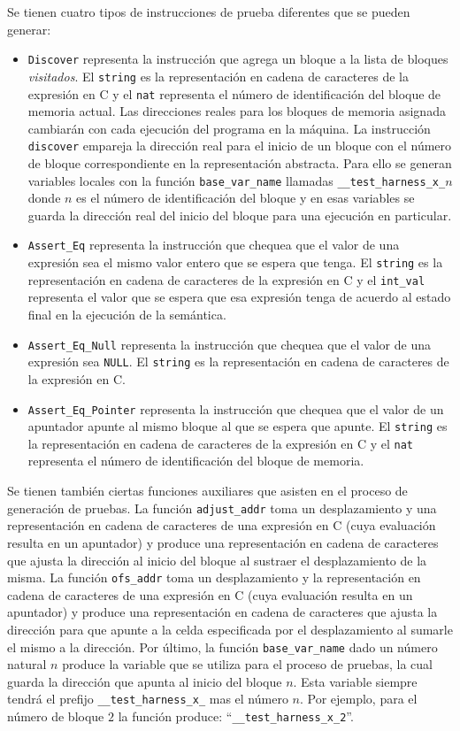 Se tienen cuatro tipos de instrucciones de prueba diferentes que se pueden generar:

\begin{itemize}
  \item{\verb|Discover| representa la instrucción que agrega un bloque a la lista de bloques \textit{visitados}.
  El \verb|string| es la representación en cadena de caracteres de la expresión en C y el \verb|nat| representa el número de identificación del bloque de memoria actual.
  Las direcciones reales para los bloques de memoria asignada cambiarán con cada ejecución del programa en la máquina.
  La instrucción \verb|discover| empareja la dirección real para el inicio de un bloque con el número de bloque correspondiente en la representación abstracta.
  Para ello se generan variables locales con la función \verb|base_var_name| llamadas \verb|__test_harness_x_|$n$ donde $n$ es el número de identificación del bloque y en esas variables se guarda la dirección real del inicio del bloque para una ejecución en particular.}
  \item{\verb|Assert_Eq| representa la instrucción que chequea que el valor de una expresión sea el mismo valor entero que se espera que tenga.
  El \verb|string| es la representación en cadena de caracteres de la expresión en C y el \verb|int_val| representa el valor que se espera que esa expresión tenga de acuerdo al estado final en la ejecución de la semántica.}
  \item{\verb|Assert_Eq_Null| representa la instrucción que chequea que el valor de una expresión sea \verb|NULL|.
  El \verb|string| es la representación en cadena de caracteres de la expresión en C.}
  \item{\verb|Assert_Eq_Pointer| representa la instrucción que chequea que el valor de un apuntador apunte al mismo bloque al que se espera que apunte.
  El \verb|string| es la representación en cadena de caracteres de la expresión en C y el \verb|nat| representa el número de identificación del bloque de memoria.}
\end{itemize}

Se tienen también ciertas funciones auxiliares que asisten en el proceso de generación de pruebas.
La función \verb|adjust_addr| toma un desplazamiento y una representación en cadena de caracteres de una expresión en C (cuya evaluación resulta en un apuntador) y produce una representación en cadena de caracteres que ajusta la dirección al inicio del bloque al sustraer el desplazamiento de la misma.
La función \verb|ofs_addr| toma un desplazamiento y la representación en cadena de caracteres de una expresión en C (cuya evaluación resulta en un apuntador) y produce una representación en cadena de caracteres que ajusta la dirección para que apunte a la celda especificada por el desplazamiento al sumarle el mismo a la dirección.
Por último, la función \verb|base_var_name| dado un número natural $n$ produce la variable que se utiliza para el proceso de pruebas, la cual guarda la dirección que apunta al inicio del bloque $n$.
Esta variable siempre tendrá el prefijo \verb|__test_harness_x_| mas el número $n$.
Por ejemplo, para el número de bloque $2$ la función produce: ``\verb|__test_harness_x_2|''.


